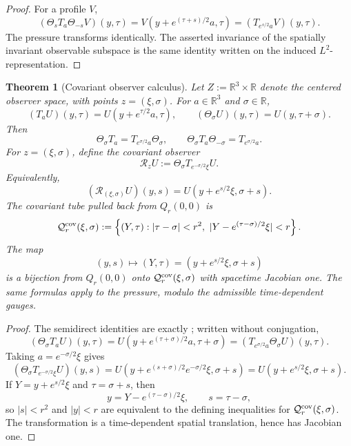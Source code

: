 \documentclass[11pt]{amsart}
\numberwithin{equation}{section}
\theoremstyle{plain}
\newtheorem{theorem}{Theorem}[section]
\theoremstyle{definition}
\theoremstyle{remark}
\newcommand{\calR}{\mathcal R}
\begin{document}
\begin{proof}
For a profile \(V\),
\[
   (\Theta_sT_a\Theta_{-s}V)(y,\tau)
   =
   V(y+e^{(\tau+s)/2}a,\tau)
   =
   (T_{e^{s/2}a}V)(y,\tau).
\]
The pressure transforms identically.  The asserted invariance of the
spatially invariant observable subspace is the same identity written on the
induced \(L^2\)-representation.
\end{proof}

\begin{theorem}[Covariant observer calculus]
\label{thm:covariant-observer-calculus}
Let \(Z:=\mathbb R^3\times\mathbb R\) denote the centered observer space, with
points \(z=(\xi,\sigma)\).  For \(a\in\mathbb R^3\) and
\(\sigma\in\mathbb R\),
\[
   (T_aU)(y,\tau)=U(y+e^{\tau/2}a,\tau),
   \qquad
   (\Theta_\sigma U)(y,\tau)=U(y,\tau+\sigma).
\]
Then
\[
   \Theta_\sigma T_a=T_{e^{\sigma/2}a}\Theta_\sigma,
   \qquad
   \Theta_\sigma T_a\Theta_{-\sigma}=T_{e^{\sigma/2}a}.
\]
For \(z=(\xi,\sigma)\), define the covariant observer
\[
   \calR_zU
   :=
   \Theta_\sigma T_{e^{-\sigma/2}\xi}U .
\]
Equivalently,
\[
   (\calR_{(\xi,\sigma)}U)(y,s)
   =
   U(y+e^{s/2}\xi,\sigma+s).
\]
The covariant tube pulled back from \(Q_r(0,0)\) is
\[
   \mathcal Q_r^{\rm cov}(\xi,\sigma)
   :=
   \left\{
      (Y,\tau):
      |\tau-\sigma|<r^2,\ 
      |Y-e^{(\tau-\sigma)/2}\xi|<r
   \right\}.
\]
The map
\[
   (y,s)\mapsto(Y,\tau)
   =
   (y+e^{s/2}\xi,\sigma+s)
\]
is a bijection from \(Q_r(0,0)\) onto
\(\mathcal Q_r^{\rm cov}(\xi,\sigma)\) with spacetime Jacobian one.  The same
formulas apply to the pressure, modulo the admissible time-dependent gauges.
\end{theorem}

\begin{proof}
The semidirect identities are exactly
; written without conjugation,
\[
   (\Theta_\sigma T_aU)(y,\tau)
   =
   U(y+e^{(\tau+\sigma)/2}a,\tau+\sigma)
   =
   (T_{e^{\sigma/2}a}\Theta_\sigma U)(y,\tau).
\]
Taking \(a=e^{-\sigma/2}\xi\) gives
\[
   (\Theta_\sigma T_{e^{-\sigma/2}\xi}U)(y,s)
   =
   U(y+e^{(s+\sigma)/2}e^{-\sigma/2}\xi,\sigma+s)
   =
   U(y+e^{s/2}\xi,\sigma+s).
\]
If \(Y=y+e^{s/2}\xi\) and \(\tau=\sigma+s\), then
\[
   y=Y-e^{(\tau-\sigma)/2}\xi,\qquad s=\tau-\sigma,
\]
so \(|s|<r^2\) and \(|y|<r\) are equivalent to the defining inequalities for
\(\mathcal Q_r^{\rm cov}(\xi,\sigma)\).  The transformation is a
time-dependent spatial translation, hence has Jacobian one.
\end{proof}
\end{document}
